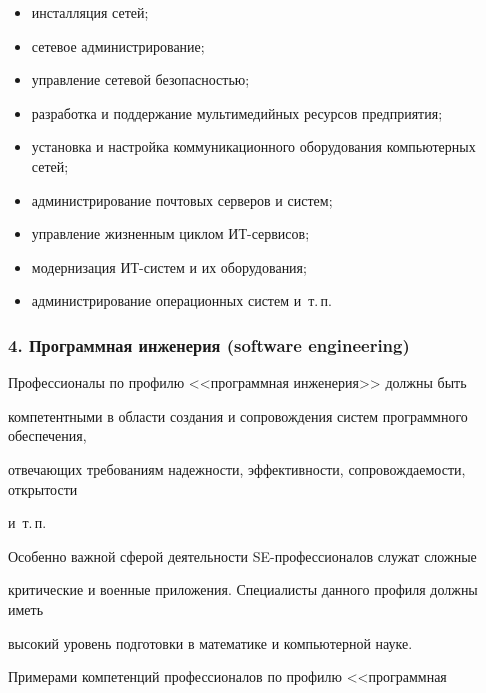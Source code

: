       \begin{itemize}

\item инсталляция сетей;

\item сетевое администрирование;

\item управление сетевой безопасностью;

\item разработка и поддержание мультимедийных ресурсов предприятия;

\item установка и настройка коммуникационного оборудования компьютерных сетей;

\item администрирование почтовых серверов и систем;

\item управление жизненным циклом ИТ-сервисов;

\item модернизация ИТ-систем и их оборудования;

\item администрирование операционных систем и~т.\,п.

\end{itemize}



      \subsubsection*{4. Программная инженерия (software engineering)}

      

      Профессионалы по профилю <<программная инженерия>> должны быть 

компетентными в области создания и сопровождения систем программного обеспечения, 

отвечающих требованиям надежности, эффективности, сопровождаемости, открытости 

и~т.\,п. 

      

      Особенно важной сферой деятельности SE-профессионалов служат сложные 

критические и военные приложения. Специалисты данного профиля должны иметь 

высокий уровень подготовки в математике и компьютерной науке. 

      

      Примерами компетенций профессионалов по профилю <<программная 

